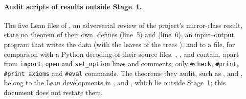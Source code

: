 \paragraph{Audit scripts of results outside Stage~1.} The five Lean files of , an adversarial review of
the project's mirror-class result, state no theorem of their own.  defines 
(line~5) and  (line~6), an input--output program that writes the data  (with the
leaves of the trees ),  and  to a file, for comparison with a
Python decoding of their source files. , ,
 and  contain, apart from \texttt{import}, \texttt{open}
and \texttt{set\_option} lines and comments, only \texttt{\#check}, \texttt{\#print}, \texttt{\#print axioms} and
\texttt{\#eval} commands. The theorems they audit, such as ,
 and , belong to the Lean developments in
,  and , which lie outside Stage~1; this document does not restate them.
